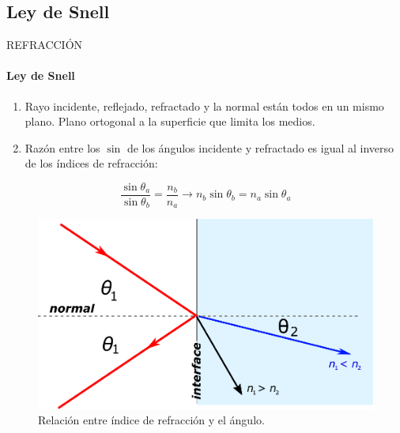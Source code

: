 \subsection{Ley de Snell}
\begin{frame}{REFRACCIÓN}
    \framesubtitle{Ley de Snell}
    \begin{enumerate}
        \item Rayo incidente, reflejado, refractado y la normal están todos en un mismo plano. Plano ortogonal a la superficie que limita los medios.
        \item Razón entre los $\sin$ de los ángulos incidente y refractado es igual al inverso de los índices de refracción:
    \end{enumerate}
    \begin{equation}
        \frac{\sin \theta_a}{\sin \theta_b}=\frac{n_b}{n_a}\longrightarrow n_b\sin\theta_b=n_a\sin\theta_a
    \end{equation}
    \begin{figure}
        \includegraphics[scale=0.3]{david/index.pdf}
        \caption{Relación entre índice de refracción y el ángulo.}
    \end{figure}
\end{frame}
